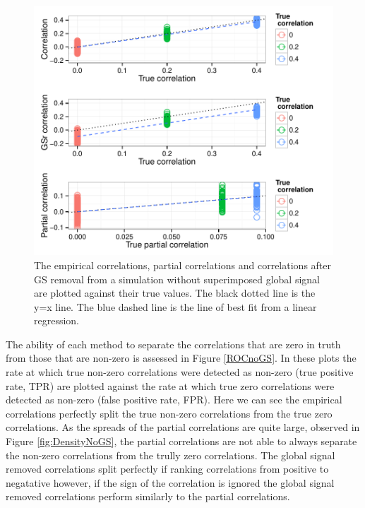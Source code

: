 \documentclass[a4paper]{article}\usepackage[]{graphicx}\usepackage[]{color}
\makeatletter
\def\maxwidth{ %
  \ifdim\Gin@nat@width>\linewidth
    \linewidth
  \else
    \Gin@nat@width
  \fi
}
\newenvironment{knitrout}{}{} %
\makeatother
\begin{document}
\begin{knitrout}
\color{fgcolor}\begin{figure}[]


{\centering \includegraphics[width=\maxwidth]{GSFigs/GSdotPlotNoGS} 

}

\caption[The empirical correlations, partial correlations and correlations after GS removal from a simulation without superimposed global signal are plotted against their true values]{The empirical correlations, partial correlations and correlations after GS removal from a simulation without superimposed global signal are plotted against their true values. The black dotted line is the y=x line. The blue dashed line is the line of best fit from a linear regression.\label{fig:dotPlotNoGS}}
\end{figure}


\end{knitrout}


The ability of each method to separate the correlations that are zero in truth from those that are non-zero is assessed in Figure \ref{ROCnoGS}. In these plots the rate at which true non-zero correlations were detected as non-zero (true positive rate, TPR) are plotted against  the rate at which true zero correlations were detected as non-zero (false positive rate, FPR). Here we can see the empirical correlations perfectly split the true non-zero correlations from the true zero correlations. As the spreads of the partial correlations are quite large, observed in Figure \ref{fig:DensityNoGS}, the partial correlations are not able to always separate the non-zero correlations from the trully zero correlations. The global signal removed correlations split perfectly if ranking correlations from positive to negatative however, if the sign of the correlation is ignored the global signal removed correlations perform similarly to the partial correlations. 
\end{document}
